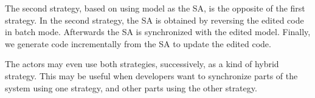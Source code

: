 The second strategy, based on using model as the SA,
is the opposite of the first strategy. 
In the second strategy, the SA is
obtained by reversing the edited code in batch mode.
Afterwards the SA is synchronized with the edited model.
Finally, we generate code incrementally from the SA to update the edited code.

%
%

The actors may even use both strategies, successively, as a kind of hybrid strategy.
This may be useful
when developers want to synchronize parts of the system using one strategy,
and other parts using the other strategy. %


